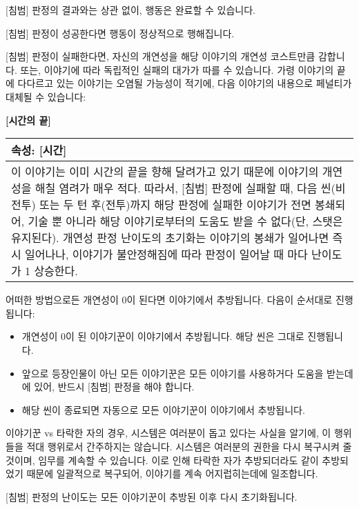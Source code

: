 \documentclass[12pt]{report}
\newenvironment{story}[2]
{\begin{center}
		{\large \textbf{[#1]}}\\[1ex]
		\begin{tabular}{|p{\textwidth}|}
			\hline
			\textbf{속성}: #2
			\\
			\hline
		}
		{ 
			\\\hline
		\end{tabular}
	\end{center}
}
\begin{document}
	[침범] 판정의 결과와는 상관 없이, 행동은 완료할 수 있습니다.
	
	[침범] 판정이 성공한다면 행동이 정상적으로 행해집니다.
	
	[침범] 판정이 실패한다면, 자신의 개연성을 해당 이야기의 개연성 코스트만큼 감합니다. 또는, 이야기에 따라 독립적인 실패의 대가가 따를 수 있습니다. 가령 이야기의 끝에 다다르고 있는 이야기는 오염될 가능성이 적기에, 다음 이야기의 내용으로 페널티가 대체될 수 있습니다:
	\begin{story}{시간의 끝}{[시간]}
		이 이야기는 이미 시간의 끝을 향해 달려가고 있기 때문에 이야기의 개연성을 해칠 염려가 매우 적다. 따라서, [침범] 판정에 실패할 때, 다음 씬(비전투) 또는 두 턴 후(전투)까지 해당 판정에 실패한 이야기가 전면 봉쇄되어, 기술 뿐 아니라 해당 이야기로부터의 도움도 받을 수 없다(단, 스탯은 유지된다). 개연성 판정 난이도의 초기화는 이야기의 봉쇄가 일어나면 즉시 일어나나, 이야기가 불안정해짐에 따라 판정이 일어날 때 마다 난이도가 1 상승한다.
	\end{story}
	
	어떠한 방법으로든 개연성이 0이 된다면 이야기에서 추방됩니다. 다음이 순서대로 진행됩니다:
	\begin{itemize}
		\item 개연성이 0이 된 이야기꾼이 이야기에서 추방됩니다. 해당 씬은 그대로 진행됩니다.
		\item 앞으로 등장인물이 아닌 모든 이야기꾼은 모든 이야기를 사용하거다 도움을 받는데에 있어, 반드시 [침범] 판정을 해야 합니다.
		\item 해당 씬이 종료되면 자동으로 모든 이야기꾼이 이야기에서 추방됩니다.
	\end{itemize}
	이야기꾼 vs 타락한 자의 경우, 시스템은 여러분이 돕고 있다는 사실을 알기에, 이 행위들을 적대 행위로서 간주하지는 않습니다. 시스템은 여러분의 권한을 다시 복구시켜 줄 것이며, 임무를 계속할 수 있습니다. 이로 인해 타락한 자가 추방되더라도 같이 추방되었기 때문에 일괄적으로 복구되어, 이야기를 계속 어지럽히는데에 일조합니다.
	
	[침범] 판정의 난이도는 모든 이야기꾼이 추방된 이후 다시 초기화됩니다.
	
\end{document}
